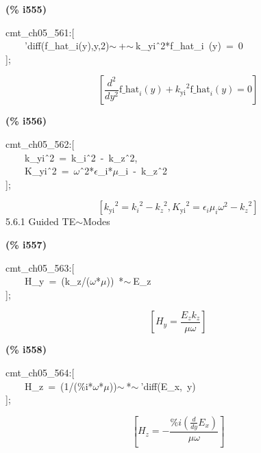\documentclass[fleqn]{article}
\begin{document}
\noindent
\begin{minipage}[t]{4.000000em}\color{red}\bfseries
(\% i555)	
\end{minipage}
\begin{minipage}[t]{\textwidth}\color{blue}
cmt\_ch05\_561:[\\
\ \ \ \ 'diff(f\_hat\_i(y),y,2)\ensuremath{\sim\ }+\ensuremath{\sim\ }k\_yi\^\ 2*f\_hat\_i\ (y)\ =\ 0\\
];
\end{minipage}
\[\displaystyle \tag{\% o555} 
\left[ \frac{{{d}^{2}}}{d {{y}^{2}}} {{\ensuremath{\mathrm{f\_ hat}}}_i}(y)+{{{k_{\ensuremath{\mathrm{yi}}}}}^{2}} {{\ensuremath{\mathrm{f\_ hat}}}_i}(y)=0\right] \mbox{}
\]


\noindent
\begin{minipage}[t]{4.000000em}\color{red}\bfseries
(\% i556)	
\end{minipage}
\begin{minipage}[t]{\textwidth}\color{blue}
cmt\_ch05\_562:[\\
\ \ \ \ k\_yi\^\ 2\ =\ k\_i\^\ 2\ -\ k\_z\^\ 2,\ \\
\ \ \ \ K\_yi\^\ 2\ =\ \ensuremath{\omega}\^\ 2*\ensuremath{\epsilon}\_i*\ensuremath{\mu}\_i\ -\ k\_z\^\ 2\\
];
\end{minipage}
\[\displaystyle \tag{\% o556} 
\left[ {{{k_{\ensuremath{\mathrm{yi}}}}}^{2}}={{{k_i}}^{2}}-{{{k_z}}^{2}}\operatorname{,}{{{K_{\ensuremath{\mathrm{yi}}}}}^{2}}={{\epsilon }_i} {{\mu }_i} {{\omega }^{2}}-{{{k_z}}^{2}}\right] \mbox{}
\]
5.6.1   Guided TE\ensuremath{\sim }Modes


\noindent
\begin{minipage}[t]{4.000000em}\color{red}\bfseries
(\% i557)	
\end{minipage}
\begin{minipage}[t]{\textwidth}\color{blue}
cmt\_ch05\_563:[\\
\ \ \ \ H\_y\ =\ (k\_z/(\ensuremath{\omega}*\ensuremath{\mu}))\ *\ensuremath{\sim\ }E\_z\\
];
\end{minipage}
\[\displaystyle \tag{\% o557} 
\left[ {H_y}=\frac{{E_z} {k_z}}{\mu  \omega }\right] \mbox{}
\]


\noindent
\begin{minipage}[t]{4.000000em}\color{red}\bfseries
(\% i558)	
\end{minipage}
\begin{minipage}[t]{\textwidth}\color{blue}
cmt\_ch05\_564:[\\
\ \ \ \ H\_z\ =\ (1/(\%i*\ensuremath{\omega}*\ensuremath{\mu}))\ensuremath{\sim\ }*\ensuremath{\sim\ }'diff(E\_x,\ y)\\
];
\end{minipage}
\[\displaystyle \tag{\% o558} 
\left[ {H_z}=-\frac{\% i \left( \frac{d}{d y} {E_x}\right) }{\mu  \omega }\right] \mbox{}
\]
\end{document}
